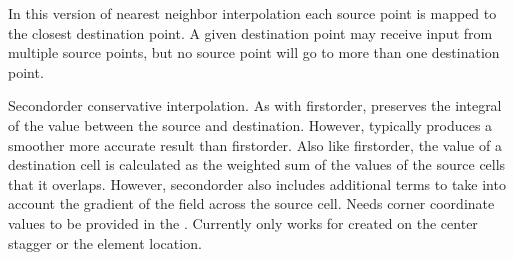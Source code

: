 \documentclass[letterpaper,10pt,english]{sphinxmanual}
\begin{document}
\begin{fulllineitems}

\begin{fulllineitems}
\label{\detokenize{RegridMethod:ESMF.api.constants.RegridMethod.NEAREST_DTOS}}
In this version of nearest neighbor interpolation each source point is 
mapped to the closest destination point. A given destination point may 
receive input from multiple source points, but no source point will go to 
more than one destination point.

\end{fulllineitems}


\begin{fulllineitems}
\label{\detokenize{RegridMethod:ESMF.api.constants.RegridMethod.CONSERVE_2ND}}
Second\sphinxhyphen{}order conservative interpolation. As with first\sphinxhyphen{}order, preserves the 
integral of the value between the source and destination. However, typically 
produces a smoother more accurate result than first\sphinxhyphen{}order. Also like 
first\sphinxhyphen{}order, the value of a destination cell is calculated as the weighted 
sum of the values of the source cells that it overlaps. However, 
second\sphinxhyphen{}order also includes additional terms to take into account the 
gradient of the field across the source cell. Needs corner coordinate 
values to be provided in the {\hyperref[\detokenize{grid:ESMF.api.grid.Grid}]{}}. Currently only 
works for {\hyperref[\detokenize{field:ESMF.api.field.Field}]{}} created 
on the {\hyperref[\detokenize{grid:ESMF.api.grid.Grid}]{}} center stagger or the 
{\hyperref[\detokenize{mesh:ESMF.api.mesh.Mesh}]{}} element location.

\end{fulllineitems}


\end{fulllineitems}
\end{document}
